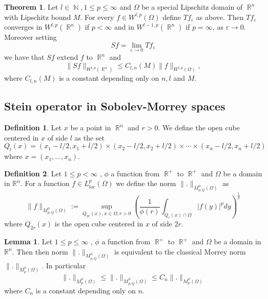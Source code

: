 \documentclass[12pt]{article}
\theoremstyle{definition}
\newtheorem{definition}{Definition}
\newtheorem{theorem}{Theorem}
\newtheorem{lemma}{Lemma}
\DeclareMathOperator\rr{\mathbb{R}}
\DeclareMathOperator\nn{\mathbb{N}}
\begin{document}
\begin{theorem}\label{Sdef}
Let $l \in \nn,1\le p \le \infty$ and $\Omega$ be a special Lipschitz domain of $\rr^n$ with Lipschitz bound $M$. For every $f \in W^{l,p}(\Omega)$ define $Tf_\varepsilon$ as above. Then $Tf_\varepsilon $ converges in $W^{l,p}(\rr^n)$ if $p<\infty$ and in $W^{l-1,p}(\rr^n)$ if $p=\infty$, as $\varepsilon \to 0.$ Moreover setting
\[ Sf=\lim_{\varepsilon \to 0} Tf_\varepsilon\]
we have that $Sf$ extend $f$ to $\rr^n$ and 
\[ \| Sf\|_{W^{l,p}(\rr^n)} \le C_{l,n}(M) \| f\|_{W^{l,p}(\Omega) } ,\] 
where $C_{l,n}(M)$ is a constant depending only on $n,l$ and $M.$
\end{theorem}





\subsection{Stein operator in Sobolev-Morrey spaces}

\begin{definition}
Let $x$ be a point in $\rr^n$ and $r>0$. We define the open cube centered in $x$ of side $l$ as the set 
\[ Q_l(x)=(x_1-l/2,x_1+l/2) \times (x_2-l/2,x_2+l/2) \times \cdots \times (x_n-l/2,x_n+l/2)   \]
where $x=(x_1,...,x_n).$
\end{definition}


\begin{definition}
Let $1\le p< \infty$ , $\phi$ a function from $\rr^+$ to $\rr^+$ and $\Omega$ be a domain in $\mathbb{R}^n$. For a function $f \in L^p_{loc}(\Omega)$ we define the norm $\| .\|_{M_{p,Q}^\phi(\Omega)}$ as
\[ \|f\|_{M_{p,Q}^\phi(\Omega)}:=\sup_{Q_{2r}(x), x \in \Omega,r>0} \left(  \frac{1}{\phi(r)}\int_{Q_r(x)\cap \Omega} |f(y)|^p dy \right )^{\frac{1}{p}}\]
where $Q_{2r}(x)$ is the open cube centered in $x$ of side $2r$.
\end{definition}
\begin{lemma}\label{cubicmorrey}
Let $1\le p\le \infty$ , $\phi$ a function from $\rr^+$ to $\rr^+$ and $\Omega$ be a domain in $\mathbb{R}^n$. Then then norm $\| .\|_{M_{p,Q}^\phi(\Omega)}$ is equivalent to the classical Morrey norm $\|.\|_{M_{p}^\phi(\Omega)}$. In particular 
\[ \| .\|_{M_{p}^\phi(\Omega)} \le \| .\|_{M_{p,Q}^\phi(\Omega)}\le C_{n}\| .\|_{M_{p}^\phi(\Omega)}\]
where $C_n$ is a constant depending only on $n.$
\end{lemma}
\end{document}
